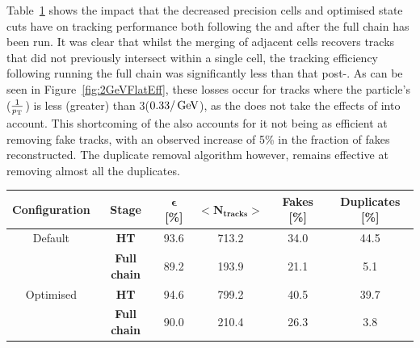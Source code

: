 Table~\ref{tab:trackFindingPerformance2GeVHT} shows the impact that the decreased precision \HT cells and optimised \KF state cuts have on tracking performance both following the \HT and after the full chain has been run.
It was clear that whilst the merging of adjacent \HT cells recovers tracks that did not previously intersect within a single \HT cell, the tracking efficiency following running the full chain was significantly less than that post-\HT.
As can be seen in Figure~\ref{fig:2GeVFlatEff}, these losses occur for tracks where the particle's \pT ($\frac{1}{p_{\mathrm{T}}}$) is less (greater) than 3\GeV ($0.33/\,\text{Ge\hspace{-.08em}V}$), as the \KF does not take the effects of \MS into account.
This shortcoming of the \KF also accounts for it not being as efficient at removing fake tracks, with an observed increase of 5\% in the fraction of fakes reconstructed.
The duplicate removal algorithm however, remains effective at removing almost all the duplicates.

\begin{table}[htbp]
\label{tab:trackFindingPerformance2GeVHT}
  \centering
\begin{tabular}{cccccc}
   \hline
   \bf{Configuration} & \bf{Stage} & \bf{$\bm{\epsilon}$ [\%]} & $\bm{<N_{tracks}>}$ & \bf{Fakes [\%]} & \bf{Duplicates [\%]}  \\
        \hline
    Default & \bf{HT}     & 93.6 & 713.2 & 34.0 & 44.5 \\  
    & \bf{Full chain}     & 89.2 & 193.9 & 21.1 & 5.1 \\      
    \hline
    Optimised & \bf{HT}     & 94.6 & 799.2 & 40.5 & 39.7 \\  
    & \bf{Full chain}     & 90.0 & 210.4 & 26.3 & 3.8 \\      
   \hline
   
 \end{tabular}%
\end{table}

